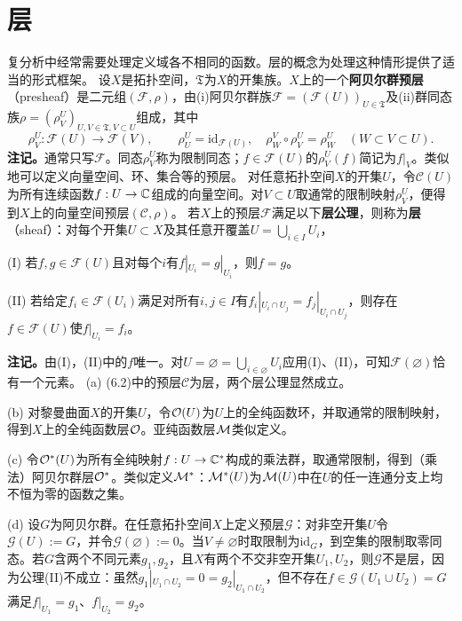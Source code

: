 \section{层}
复分析中经常需要处理定义域各不相同的函数。层的概念为处理这种情形提供了适当的形式框架。
设$X$是拓扑空间，$\mathfrak T$为$X$的开集族。$X$上的一个\textbf{阿贝尔群预层}（presheaf）是二元组$(\mathcal F,\rho)$，由(i)阿贝尔群族$\mathcal F=(\mathcal F(U))_{U\in\mathfrak T}$及(ii)群同态族$\rho=(\rho_V^U)_{U,V\in\mathfrak T,V\subset U}$组成，其中
\[
\rho_V^U:\mathcal F(U)\to\mathcal F(V),\qquad
\rho_U^U=\mathrm{id}_{\mathcal F(U)},\quad
\rho_W^V\circ\rho_V^U=\rho_W^U\quad(W\subset V\subset U).
\]
\textbf{注记。}通常只写$\mathcal F$。同态$\rho_V^U$称为限制同态；$f\in\mathcal F(U)$的$\rho_V^U(f)$简记为$f|_V$。类似地可以定义向量空间、环、集合等的预层。
对任意拓扑空间$X$的开集$U$，令$\mathcal C(U)$为所有连续函数$f:U\to\mathbb C$组成的向量空间。对$V\subset U$取通常的限制映射$\rho_V^U$，便得到$X$上的向量空间预层$(\mathcal C,\rho)$。
若$X$上的预层$\mathcal F$满足以下\textbf{层公理}，则称为\textbf{层}（sheaf）：对每个开集$U\subset X$及其任意开覆盖$U=\bigcup_{i\in I}U_i$，

(I) 若$f,g\in\mathcal F(U)$且对每个$i$有$f|_{U_i}=g|_{U_i}$，则$f=g$。

(II) 若给定$f_i\in\mathcal F(U_i)$满足对所有$i,j\in I$有$f_i|_{U_i\cap U_j}=f_j|_{U_i\cap U_j}$，则存在$f\in\mathcal F(U)$使$f|_{U_i}=f_i$。

\textbf{注记。}由(I)，(II)中的$f$唯一。对$U=\varnothing=\bigcup_{i\in\varnothing}U_i$应用(I)、(II)，可知$\mathcal F(\varnothing)$恰有一个元素。
(a) (6.2)中的预层$\mathcal C$为层，两个层公理显然成立。

(b) 对黎曼曲面$X$的开集$U$，令$\mathcal O(U)$为$U$上的全纯函数环，并取通常的限制映射，得到$X$上的全纯函数层$\mathcal O$。亚纯函数层$\mathcal M$类似定义。

(c) 令$\mathcal O^*(U)$为所有全纯映射$f:U\to\mathbb C^*$构成的乘法群，取通常限制，得到（乘法）阿贝尔群层$\mathcal O^*$。类似定义$\mathcal M^*$：$\mathcal M^*(U)$为$\mathcal M(U)$中在$U$的任一连通分支上均不恒为零的函数之集。

(d) 设$G$为阿贝尔群。在任意拓扑空间$X$上定义预层$\mathcal G$：对非空开集$U$令$\mathcal G(U):=G$，并令$\mathcal G(\varnothing):=0$。当$V\ne\varnothing$时取限制为$\mathrm{id}_G$，到空集的限制取零同态。若$G$含两个不同元素$g_1,g_2$，且$X$有两个不交非空开集$U_1,U_2$，则$\mathcal G$不是层，因为公理(II)不成立：虽然$g_1|_{U_1\cap U_2}=0=g_2|_{U_1\cap U_2}$，但不存在$f\in\mathcal G(U_1\cup U_2)=G$满足$f|_{U_1}=g_1$、$f|_{U_2}=g_2$。

